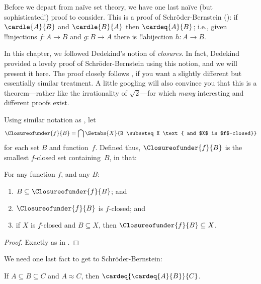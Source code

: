 \documentclass[../../../include/open-logic-section]{subfiles}
\begin{document}


Before we depart from na\"ive set theory, we have one last na\"ive
(but sophisticated!) proof to consider. This is a proof of
Schr\"oder-Bernstein (): if
$\cardle{A}{B}$ and $\cardle{B}{A}$ then $\cardeq{A}{B}$; i.e., given
!!{injection}s $f \colon A \to B$ and $g \colon B \to A$ there is
!!a{bijection} $h \colon A \to B$. 

In this chapter, we followed Dedekind's notion of \emph{closures}. In
fact, Dedekind provided a lovely proof of Schr\"oder-Bernstein using this notion, and we
will present it here. The proof closely follows
\citet[pp.~157--8]{Potter2004}, if you want a slightly different but
essentially similar treatment. A little googling will also convince
you that this is a theorem---rather like the irrationality of
$\sqrt{2}$---for which \emph{many} interesting and different proofs
exist.

Using similar notation as ,
let
\[
\Closureofunder{f}{B} = \bigcap \Setabs{X}{B \subseteq X 
\text{ and $X$ is $f$-closed}}
\]
for each set $B$ and function~$f$. Defined thus,
$\Closureofunder{f}{B}$ is the smallest $f$-closed set containing~$B$,
in that:

\begin{lem}
	For any function $f$, and any $B$:
	\begin{enumerate}
		\item{} $B \subseteq \Closureofunder{f}{B}$; and
		\item{} $\Closureofunder{f}{B}$ is $f$-closed; and
		\item{} if $X$ is $f$-closed and $B
		\subseteq X$, then $\Closureofunder{f}{B} \subseteq X$.
	\end{enumerate}
\end{lem}

\begin{proof}
Exactly as in .
\end{proof}

We need one last fact to get to Schr\"oder-Bernstein:

\begin{prop}
If $A \subseteq B \subseteq C$ and $A \approx C$, then $\cardeq{\cardeq{A}{B}}{C}$.
\end{prop}
\end{document}
